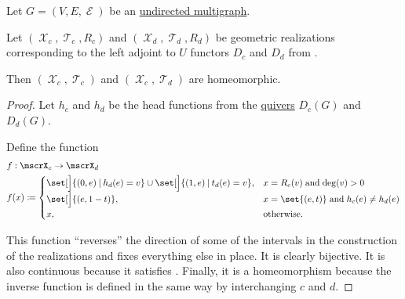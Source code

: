 \begin{proposition}\label{thm:undirected_multigraph_geometric_realizations_homeomorphic}
  Let \( G = (V, E, \mscrE) \) be an \hyperref[def:undirected_multigraph]{undirected multigraph}.

  Let \( (\mscrX_c, \mscrT_c, R_c) \) and \( (\mscrX_d, \mscrT_d, R_d) \) be geometric realizations corresponding to the left adjoint to \( U \) functors \( D_c \) and \( D_d \) from .

  Then \( (\mscrX_c, \mscrT_c) \) and \( (\mscrX_c, \mscrT_d) \) are homeomorphic.
\end{proposition}
\begin{proof}
  Let \( h_c \) and \( h_d \) be the head functions from the \hyperref[def:quiver]{quivers} \( D_c(G) \) and \( D_d(G) \).

  Define the function
  \begin{equation*}
    \begin{aligned}
      &f: \mscrX_c \to \mscrX_d \\
      &f(x) \coloneqq \begin{cases}
        \set[\Big]{ (0, e) \given h_d(e) = v } \cup \set[\Big]{ (1, e) \given t_d(e) = v }, &x = R_c(v) \T{and} \deg(v) > 0 \\
        \set[\Big]{ (e, 1 - t) },                                                           &x = \set{ (e, t) } \T{and} h_c(e) \neq h_d(e) \\
        x,                                                                                  &\T{otherwise.}
      \end{cases}
    \end{aligned}
  \end{equation*}

  This function \enquote{reverses} the direction of some of the intervals in the construction of the realizations and fixes everything else in place. It is clearly bijective. It is also continuous because it satisfies . Finally, it is a homeomorphism because the inverse function is defined in the same way by interchanging \( c \) and \( d \).
\end{proof}

